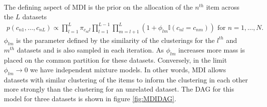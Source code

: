 \documentclass[]{article}
\begin{document}

The defining aspect of MDI is the prior on the allocation of the $n^{th}$ item across the $L$ datasets
\begin{align}
	p(c_{n1}, \ldots, c_{nL}) \propto \prod_{l=1}^L \pi_{c_{nl}l}\prod_{l=1}^{L-1}\prod_{m=l+1}^L(1 + \phi_{lm} \mathbb{I}(c_{nl} = c_{nm})) \textrm{ for $n = 1,\ldots,N$.}
	\label{eqn:mdiPrior}
\end{align}
$\phi_{lm}$ is the parameter defined by the similarity of the clusterings for the $l^{th}$ and $m^{th}$ datasets and is also sampled in each iteration. As $\phi_{lm}$ increases more mass is placed on the common partition for these datasets. Conversely, in the limit $\phi_{lm}\to 0$ we have independent mixture models. In other words, MDI allows datasets with similar clustering of the items to inform the clustering in each other more strongly than the clustering for an unrelated dataset. The DAG for this model for three datasets is shown in figure \ref{fig:MDIDAG}.
\end{document}
